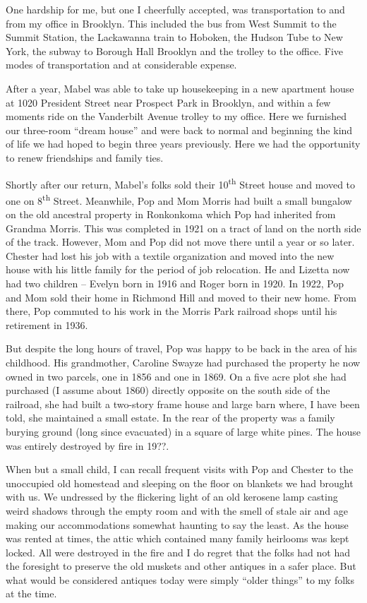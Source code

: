 \documentclass[12pt]{book}              %
\begin{document}
One hardship for me, but one I cheerfully accepted, was transportation to and from my office in Brooklyn. This included the bus from West Summit to the Summit Station, the Lackawanna train to Hoboken, the Hudson Tube to New York, the subway to Borough Hall Brooklyn and the trolley to the office. Five modes of transportation and at considerable expense. 

After a year, Mabel was able to take up housekeeping in a new apartment house at 1020 President Street near Prospect Park in Brooklyn, and within a few moments ride on the Vanderbilt Avenue trolley to my office. Here we furnished our three-room ``dream house'' and were back to normal and beginning the kind of life we had hoped to begin three years previously. Here we had the opportunity to renew friendships and family ties. 

Shortly after our return, Mabel's folks sold their 10\textsuperscript{th} Street house and moved to one on 8\textsuperscript{th} Street. Meanwhile, Pop and Mom Morris had built a small bungalow on the old ancestral property in Ronkonkoma which Pop had inherited from Grandma Morris. This was completed in 1921 on a tract of land on the north side of the track. However, Mom and Pop did not move there until a year or so later. Chester had lost his job with a textile organization and moved into the new house with his little family for the period of job relocation. He and Lizetta now had two children -- Evelyn born in 1916 and Roger born in 1920. In 1922, Pop and Mom sold their home in Richmond Hill and moved to their new home. From there, Pop commuted to his work in the Morris Park railroad shops until his retirement in 1936.

But despite the long hours of travel, Pop was happy to be back in the area of his childhood. His grandmother, Caroline Swayze had purchased the property he now owned in two parcels, one in 1856 and one in 1869. On a five acre plot she had purchased (I assume about 1860) directly opposite on the south side of the railroad, she had built a two-story frame house and large barn where, I have been told, she maintained a small estate. In the rear of the property was a family burying ground (long since evacuated) in a square of large white pines. The house was entirely destroyed by fire in 19??. 

When but a small child, I can recall frequent visits with Pop and Chester to the unoccupied old homestead and sleeping on the floor on blankets we had brought with us. We undressed by the flickering light of an old kerosene lamp casting weird shadows through the empty room and with the smell of stale air and age making our accommodations somewhat haunting to say the least. As the house was rented at times, the attic which contained many family heirlooms was kept locked. All were destroyed in the fire and I do regret that the folks had not had the foresight to preserve the old muskets and other antiques in a safer place. But what would be considered antiques today were simply ``older things'' to my folks at the time.
\end{document}
